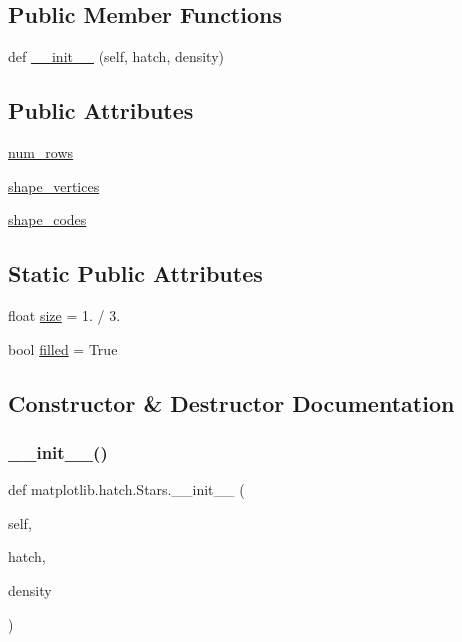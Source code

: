 \subsection*{Public Member Functions}
\begin{DoxyCompactItemize}
\item 
def \hyperlink{classmatplotlib_1_1hatch_1_1Stars_a8b57744a57c5fc11ee2de421dbbb96cb}{\+\_\+\+\_\+init\+\_\+\+\_\+} (self, hatch, density)
\end{DoxyCompactItemize}
\subsection*{Public Attributes}
\begin{DoxyCompactItemize}
\item 
\hyperlink{classmatplotlib_1_1hatch_1_1Stars_aad01c56fcb59095ea5af9ed650ce4255}{num\+\_\+rows}
\item 
\hyperlink{classmatplotlib_1_1hatch_1_1Stars_ae95d962a4670b15ac84f96ded2fecb2d}{shape\+\_\+vertices}
\item 
\hyperlink{classmatplotlib_1_1hatch_1_1Stars_a11d2cf42baa890b180de6ea780e627cc}{shape\+\_\+codes}
\end{DoxyCompactItemize}
\subsection*{Static Public Attributes}
\begin{DoxyCompactItemize}
\item 
float \hyperlink{classmatplotlib_1_1hatch_1_1Stars_ae34643985ae443f7b26b7c1b23f211b3}{size} = 1. / 3.
\item 
bool \hyperlink{classmatplotlib_1_1hatch_1_1Stars_a7c5f93459bc39c7322161f7d4029e5f4}{filled} = True
\end{DoxyCompactItemize}


\subsection{Constructor \& Destructor Documentation}
\mbox{\label{classmatplotlib_1_1hatch_1_1Stars_a8b57744a57c5fc11ee2de421dbbb96cb}} 
\subsubsection{\texorpdfstring{\+\_\+\+\_\+init\+\_\+\+\_\+()}{\_\_init\_\_()}}
{\footnotesize\ttfamily def matplotlib.\+hatch.\+Stars.\+\_\+\+\_\+init\+\_\+\+\_\+ (\begin{DoxyParamCaption}\item[{}]{self,  }\item[{}]{hatch,  }\item[{}]{density }\end{DoxyParamCaption})}



